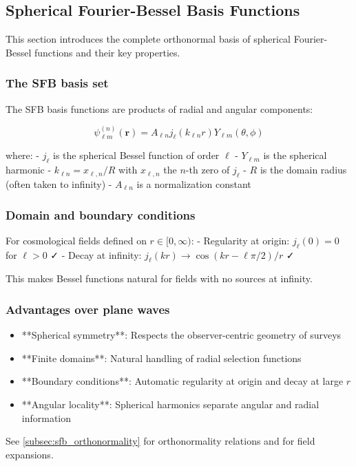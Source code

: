 \subsection{Spherical Fourier-Bessel Basis Functions}\label{subsec:sfb_basis}

This section introduces the complete orthonormal basis of spherical Fourier-Bessel functions and their key properties.

\subsubsection{The SFB basis set}

The SFB basis functions are products of radial and angular components:

\begin{equation}
\psi_{\ell m}^{(n)}(\mathbf{r}) = A_{\ell n} j_\ell(k_{\ell n} r) Y_{\ell m}(\theta, \phi)
\label{eq:sfb_basis_function}
\end{equation}

where:
- $j_\ell$ is the spherical Bessel function of order $\ell$
- $Y_{\ell m}$ is the spherical harmonic
- $k_{\ell n} = x_{\ell,n} / R$ with $x_{\ell,n}$ the $n$-th zero of $j_\ell$
- $R$ is the domain radius (often taken to infinity)
- $A_{\ell n}$ is a normalization constant

\subsubsection{Domain and boundary conditions}

For cosmological fields defined on $r \in [0, \infty)$:
- Regularity at origin: $j_\ell(0) = 0$ for $\ell > 0$ ✓
- Decay at infinity: $j_\ell(kr) \to \cos(kr - \ell\pi/2)/r$ ✓

This makes Bessel functions natural for fields with no sources at infinity.

\subsubsection{Advantages over plane waves}

\begin{itemize}
    \item **Spherical symmetry**: Respects the observer-centric geometry of surveys
    \item **Finite domains**: Natural handling of radial selection functions
    \item **Boundary conditions**: Automatic regularity at origin and decay at large $r$
    \item **Angular locality**: Spherical harmonics separate angular and radial information
\end{itemize}

See \cref{subsec:sfb_orthonormality} for orthonormality relations and  for field expansions.
